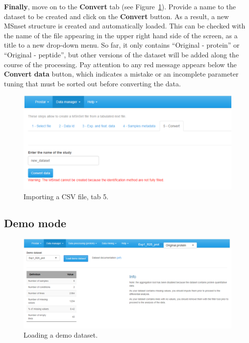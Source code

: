 \documentclass[12pt]{article}
\begin{document}
\textbf{Finally}, move on to the \textbf{Convert} tab (see Figure~\ref{fig:imp5}).
Provide a name to the dataset to be created and click on the \textbf{Convert} button.
As a result, a new MSnset structure is created and automatically loaded. This can be checked with the name of the file appearing in the upper right hand side of the screen, as a title to a new drop-down menu. So far, it only contains ``Original - protein'' or ``Original - peptide'', but other versions of the dataset will be added along the course of the processing. Pay attention to any red message appears below the \textbf{Convert data} button, which indicates a mistake or an incomplete parameter tuning that must be sorted out before converting the data.
\begin {figure}
\includegraphics[width=\textwidth]{images/convert_convert.png}
\caption{Importing a CSV file, tab 5.}\label{fig:imp5}
\end {figure}

\subsection{Demo mode} \label{sec:demomode}

\begin{figure}
\includegraphics[width=1.00\textwidth]{images/load-prot.png}
\caption{Loading a demo dataset.}
\label{fig:demomodeFig}
\end{figure}
\end{document}
